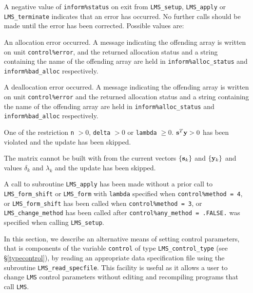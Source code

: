 \documentclass{galahad}
\newcommand{\packagename}{LMS}
\begin{document}

\galerrors
A negative value of {\tt inform\%status} on exit from
{\tt \packagename\_setup},
{\tt \packagename\_apply}
or
{\tt \packagename\_terminate}
indicates that an error has occurred. No further calls should be made
until the error has been corrected. Possible values are:

\begin{description}

 An allocation error occurred.
A message indicating the offending
array is written on unit {\tt control\%error}, and the returned allocation
status and a string containing the name of the offending array
are held in {\tt inform\%alloc\_\-status}
and {\tt inform\%bad\_alloc} respectively.

 A deallocation error occurred.
A message indicating the offending
array is written on unit {\tt control\%error} and the returned allocation
status and a string containing the name of the offending array
are held in {\tt inform\%alloc\_\-status}
and {\tt inform\%bad\_alloc} respectively.

 One of the restriction
  {\tt n} $> 0$,  {\tt delta} $> 0$ or {\tt lambda} $\geq 0$.
  ${\mathbf{s}}^T {\mathbf{y}} > 0$ has been violated and the update has
  been skipped.

 The matrix cannot be built with
 from the current vectors $\{{\mathbf{s}}_k\}$ and $\{{\mathbf{y}}_k\}$ and values
 $\delta_k$ and $\lambda_k$ and the update has been skipped.

 A call to subroutine
{\tt \packagename\_apply} has been made without a prior call to
{\tt \packagename\_form\_shift} or
{\tt \packagename\_form} with {\tt lambda} specified
 when {\tt control\%method = 4},
 or {\tt \packagename\_form\_shift} has been called when
{\tt control\%method = 3}, or
{\tt \packagename\_change\_method} has been called after
{\tt control\%any\_method = .FALSE.} was specified when
calling {\tt \packagename\_setup}.

\vspace*{1mm}


\end{description}


\galfeatures
\noindent In this section, we describe an alternative means of setting
control parameters, that is components of the variable {\tt control} of type
{\tt \packagename\_control\_type}
(see \S\ref{typecontrol}),
by reading an appropriate data specification file using the
subroutine {\tt \packagename\_read\_specfile}. This facility
is useful as it allows a user to change  {\tt \packagename} control parameters
without editing and recompiling programs that call {\tt \packagename}.
\end{document}
